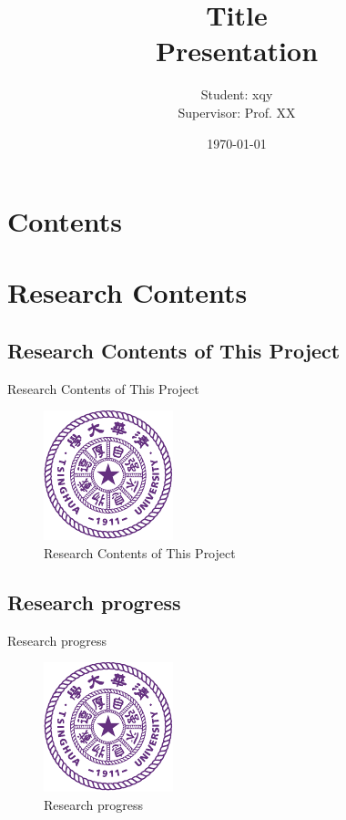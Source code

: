 \documentclass{beamer}
\title[Title]{Title\\[2mm] Presentation}
\author[Jingxuan Yang]{Student: xqy\\[5mm] Supervisor: Prof. XX}
\institute[Tsinghua University]{\small Tsinghua University}
\date{\small \vskip -10pt \today}
\begin{document}
\begin{frame}
	\maketitle
\end{frame}

\section*{Contents}
\frame{
  \frametitle{\secname}
  \tableofcontents[hideallsubsections]
}

\section{Research Contents}

\subsection{Research Contents of This Project}

\begin{frame}{Research Contents of This Project}
  \begin{figure}
    \includegraphics[width=0.4\linewidth]{thulogo}
    \caption{Research Contents of This Project}
  \end{figure}
\end{frame}

\subsection{Research progress}

\begin{frame}{Research progress}
  \begin{figure}
    \includegraphics[width=0.4\linewidth]{thulogo}
    \caption{Research progress}
  \end{figure}
\end{frame}
\end{document}
